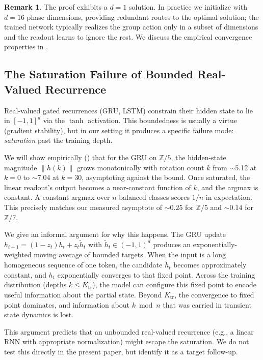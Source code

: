 \documentclass[11pt]{article}
\theoremstyle{definition}
\newtheorem{remark}[theorem]{Remark}
\newcommand{\Z}{\mathbb{Z}}
\begin{document}
\begin{remark}
The proof exhibits a $d=1$ solution. In practice we initialize with
$d=16$ phase dimensions, providing redundant routes to the optimal
solution; the trained network typically realizes the group action
only in a subset of dimensions and the readout learns to ignore the
rest. We discuss the empirical convergence properties in
.
\end{remark}

\subsection{The Saturation Failure of Bounded Real-Valued Recurrence}
\label{subsec:saturation}

Real-valued gated recurrences (GRU, LSTM) constrain their hidden
state to lie in $[-1, 1]^d$ via the $\tanh$ activation. This
boundedness is usually a virtue (gradient stability), but in our
setting it produces a specific failure mode: \emph{saturation} past
the training depth.

We will show empirically () that for the GRU on
$\Z/5$, the hidden-state magnitude $\|h(k)\|$ grows monotonically
with rotation count $k$ from $\sim$5.12 at $k=0$ to $\sim$7.04 at
$k=30$, asymptoting against the bound. Once saturated, the linear
readout's output becomes a near-constant function of $k$, and the
argmax is constant. A constant argmax over $n$ balanced classes
scores $1/n$ in expectation. This precisely matches our measured
asymptote of $\sim 0.25$ for $\Z/5$ and $\sim 0.14$ for $\Z/7$.

We give an informal argument for why this happens. The GRU update
$h_{t+1} = (1-z_t) h_t + z_t \tilde{h}_t$ with
$\tilde{h}_t \in (-1, 1)^d$ produces an exponentially-weighted
moving average of bounded targets. When the input is a long
homogeneous sequence of one token, the candidate $\tilde{h}_t$
becomes approximately constant, and $h_t$ exponentially converges
to that fixed point. Across the training distribution (depths
$k \leq K_\text{tr}$), the model can configure this fixed point to
encode useful information about the partial state. Beyond $K_\text{tr}$,
the convergence to fixed point dominates, and information about
$k \bmod n$ that was carried in transient state dynamics is lost.

This argument predicts that an unbounded real-valued recurrence
(e.g., a linear RNN with appropriate normalization) might escape the
saturation. We do not test this directly in the present paper, but
identify it as a target follow-up.
\end{document}
